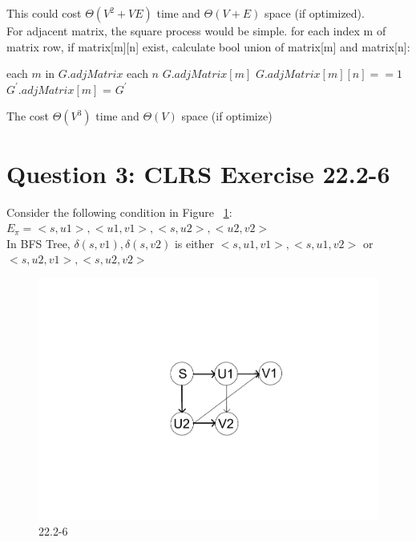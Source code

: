 \documentclass[]{article}
\begin{document}
This could cost $\Theta(V^2 + VE)$ time and $\Theta(V+E)$ space (if optimized).\\

For adjacent matrix, the square process would be simple. for each index m of matrix row, if matrix[m][n] exist, calculate bool union of matrix[m] and matrix[n]:

\begin{codebox}
	
	\li \For each $m$ in $G.adjMatrix$
	\li \Do \For each $n$ $G.adjMatrix[m]$
	\li 	\Do \If $G.adjMatrix[m][n] == 1$
	\li         \Then $G^{'}.adjMatrix[m]$ = 
	\End
	\End
	\End
	\li \Return $G^{'}$
\end{codebox}

The  cost $\Theta(V^3)$ time and $\Theta(V)$ space (if optimize)

\section{Question 3: CLRS Exercise 22.2-6}

Consider the following condition in Figure ~\ref{fig:22.2-6}: \\
$E_{\pi} = <s, u1>, <u1, v1>, <s, u2>, <u2, v2>$\\
In BFS Tree, $\delta (s, v1), \delta (s, v2) $ is either $<s, u1, v1>, <s, u1, v2>$ or $<s, u2, v1>, <s, u2, v2>$

\begin{figure}
	\centering
	\includegraphics[width=\linewidth]{2226}
	\caption{22.2-6}
	\label{fig:22.2-6}
\end{figure}
\end{document}

